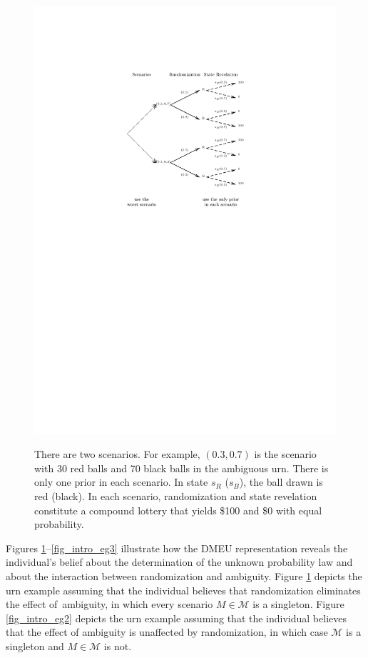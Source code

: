 \documentclass[12pt, notitlepage]{article}
\begin{document}
\begin{figure}[h!]
  \centering   \label{fig_intro_eg1}
    \includegraphics{img/intro_eg1.pdf}
    \caption{There are
two scenarios. For example, $(0.3,0.7)$ is the scenario with 30 red balls
and 70 black balls in the ambiguous urn. There is only one prior in each
scenario. In state $s_{R}$ ($s_{B}$), the ball drawn is red (black). In each
scenario, randomization and state revelation constitute a compound lottery
that yields \$100 and \$0 with equal probability.}
\end{figure}


Figures \ref{fig_intro_eg1}--\ref{fig_intro_eg3} illustrate how the DMEU
representation reveals the individual's belief about the determination of
the unknown probability law and about the interaction between randomization
and ambiguity. Figure \ref{fig_intro_eg1} depicts the urn example assuming
that the individual believes that randomization eliminates the effect of\
ambiguity, in which every scenario $M\in \mathcal{M}$ is a singleton. Figure %
\ref{fig_intro_eg2} depicts the urn example assuming that the individual
believes that the effect of ambiguity is unaffected by randomization, in
which case $\mathcal{M}$ is a singleton and $M\in \mathcal{M}$ is not.
\end{document}
